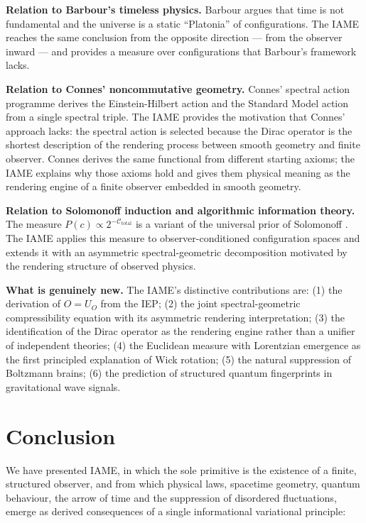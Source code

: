 \documentclass[12pt,a4paper]{article}
\newcommand{\iame}{\textsc{IAME}}
\newcommand{\Ctotal}{\mathcal{C}_{\mathrm{total}}}
\begin{document}
\textbf{Relation to Barbour's timeless physics.}
Barbour \cite{barbour1999} argues that time is not fundamental and the universe
is a static ``Platonia'' of configurations. The \iame{} reaches the same
conclusion from the opposite direction --- from the observer inward --- and
provides a measure over configurations that Barbour's framework lacks.

\textbf{Relation to Connes' noncommutative geometry.}
Connes' spectral action programme \cite{connes1996} derives the Einstein-Hilbert
action and the Standard Model action from a single spectral triple. The \iame{}
provides the motivation that Connes' approach lacks: the spectral action is
selected because the Dirac operator is the shortest description of the rendering
process between smooth geometry and finite observer. Connes derives the same
functional from different starting axioms; the \iame{} explains why those axioms
hold and gives them physical meaning as the rendering engine of a finite
observer embedded in smooth geometry.

\textbf{Relation to Solomonoff induction and algorithmic information theory.}
The measure $P(c) \propto 2^{-\Ctotal}$ is a variant of the universal prior
of Solomonoff \cite{solomonoff1964}. The \iame{} applies this measure to
observer-conditioned configuration spaces and extends it with an asymmetric
spectral-geometric decomposition motivated by the rendering structure of
observed physics.

\textbf{What is genuinely new.}
The \iame{}'s distinctive contributions are: (1) the derivation of $O = U_O$
from the IEP; (2) the joint spectral-geometric compressibility equation with
its asymmetric rendering interpretation; (3) the identification of the Dirac
operator as the rendering engine rather than a unifier of independent theories;
(4) the Euclidean measure with Lorentzian emergence as the first principled
explanation of Wick rotation; (5) the natural suppression of Boltzmann brains;
(6) the prediction of structured quantum fingerprints in gravitational wave signals.

\section{Conclusion}
\label{sec:conclusion}

We have presented \iame{}, in which the sole primitive is the existence of a
finite, structured observer, and from which physical laws, spacetime geometry,
quantum behaviour, the arrow of time and the
suppression of disordered fluctuations, emerge as
derived consequences of a single informational variational principle:
\end{document}
